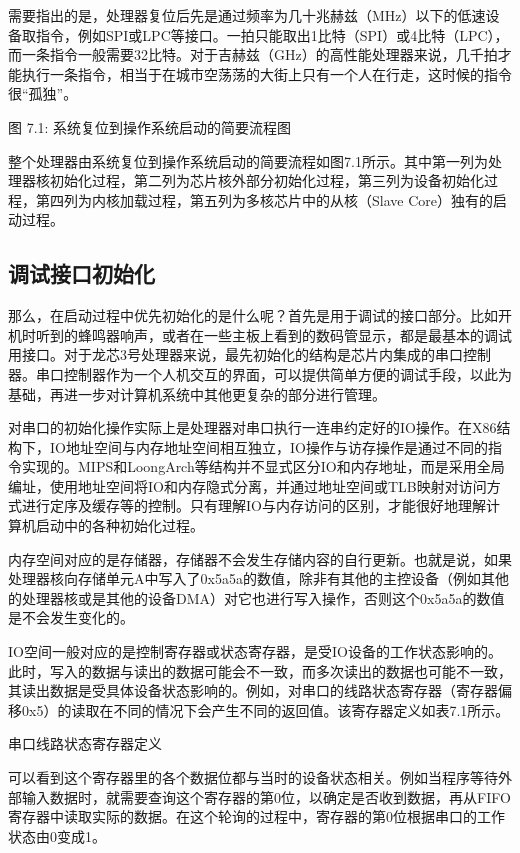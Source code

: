 \documentclass[]{ctexbook}
\begin{document}
需要指出的是，处理器复位后先是通过频率为几十兆赫兹（MHz）以下的低速设备取指令，例如SPI或LPC等接口。一拍只能取出1比特（SPI）或4比特（LPC），而一条指令一般需要32比特。对于吉赫兹（GHz）的高性能处理器来说，几千拍才能执行一条指令，相当于在城市空荡荡的大街上只有一个人在行走，这时候的指令很``孤独''。

图 7.1: 系统复位到操作系统启动的简要流程图

整个处理器由系统复位到操作系统启动的简要流程如图7.1所示。其中第一列为处理器核初始化过程，第二列为芯片核外部分初始化过程，第三列为设备初始化过程，第四列为内核加载过程，第五列为多核芯片中的从核（Slave Core）独有的启动过程。

\hypertarget{ux8c03ux8bd5ux63a5ux53e3ux521dux59cbux5316}{%
\subsection{调试接口初始化}\label{ux8c03ux8bd5ux63a5ux53e3ux521dux59cbux5316}}

那么，在启动过程中优先初始化的是什么呢？首先是用于调试的接口部分。比如开机时听到的蜂鸣器响声，或者在一些主板上看到的数码管显示，都是最基本的调试用接口。对于龙芯3号处理器来说，最先初始化的结构是芯片内集成的串口控制器。串口控制器作为一个人机交互的界面，可以提供简单方便的调试手段，以此为基础，再进一步对计算机系统中其他更复杂的部分进行管理。

对串口的初始化操作实际上是处理器对串口执行一连串约定好的IO操作。在X86结构下，IO地址空间与内存地址空间相互独立，IO操作与访存操作是通过不同的指令实现的。MIPS和LoongArch等结构并不显式区分IO和内存地址，而是采用全局编址，使用地址空间将IO和内存隐式分离，并通过地址空间或TLB映射对访问方式进行定序及缓存等的控制。只有理解IO与内存访问的区别，才能很好地理解计算机启动中的各种初始化过程。

内存空间对应的是存储器，存储器不会发生存储内容的自行更新。也就是说，如果处理器核向存储单元A中写入了0x5a5a的数值，除非有其他的主控设备（例如其他的处理器核或是其他的设备DMA）对它也进行写入操作，否则这个0x5a5a的数值是不会发生变化的。

IO空间一般对应的是控制寄存器或状态寄存器，是受IO设备的工作状态影响的。此时，写入的数据与读出的数据可能会不一致，而多次读出的数据也可能不一致，其读出数据是受具体设备状态影响的。例如，对串口的线路状态寄存器（寄存器偏移0x5）的读取在不同的情况下会产生不同的返回值。该寄存器定义如表7.1所示。

\label{tab:serial-status}串口线路状态寄存器定义

可以看到这个寄存器里的各个数据位都与当时的设备状态相关。例如当程序等待外部输入数据时，就需要查询这个寄存器的第0位，以确定是否收到数据，再从FIFO寄存器中读取实际的数据。在这个轮询的过程中，寄存器的第0位根据串口的工作状态由0变成1。
\end{document}
